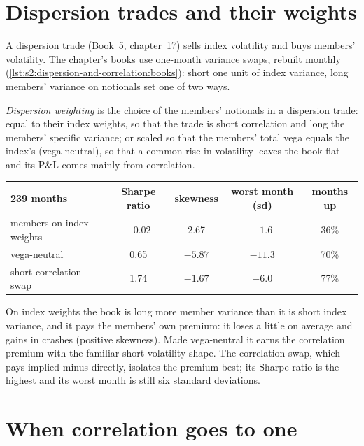 \section{Dispersion trades and their weights}

A dispersion trade (Book~5, chapter~17) sells index volatility and buys members' volatility. The chapter's books use one-month variance swaps, rebuilt
monthly (\cref{lst:s2:dispersion-and-correlation:books}): short one unit of index variance, long members' variance on notionals set one of two ways.

\begin{definition}\label{def:s2:dispersion-and-correlation:weighting}
\emph{Dispersion weighting} is the choice of the members' notionals in a dispersion trade: equal to their index weights, so
that the trade is short correlation and long the members' specific variance; or scaled so that the members' total vega equals the index's
(vega-neutral), so that a common rise in volatility leaves the book flat and its P\&L comes mainly from correlation.
\end{definition}

\begin{center}
\small
\begin{tabular}{@{}lcccc@{}}
\toprule
239 months & Sharpe ratio & skewness & worst month (sd) & months up\\
\midrule
members on index weights & $-0.02$ & 2.67 & $-1.6$ & 36\%\\
vega-neutral & 0.65 & $-5.87$ & $-11.3$ & 70\%\\
short correlation swap & 1.74 & $-1.67$ & $-6.0$ & 77\%\\
\bottomrule
\end{tabular}
\end{center}

On index weights the book is long more member variance than it is short index variance, and it pays the members' own premium: it loses a little on
average and gains in crashes (positive skewness). Made vega-neutral it earns the correlation premium with the familiar short-volatility shape. The
correlation swap, which pays implied minus  directly, isolates the premium best; its Sharpe ratio is the highest and its worst month
is still six standard deviations.

\section{When correlation goes to one}

